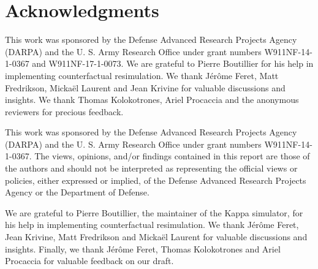 \section*{Acknowledgments}

\ifshort This work was sponsored by the Defense Advanced Research
Projects Agency (DARPA) and the U. S. Army Research Office under grant
numbers W911NF-14-1-0367 and W911NF-17-1-0073.  We are grateful to
Pierre Boutillier for his help in implementing counterfactual
resimulation. We thank J\'{e}r\^{o}me Feret, Matt Fredrikson,
Micka\"{e}l Laurent and Jean Krivine for valuable discussions and
insights. We thank Thomas Kolokotrones, Ariel Procaccia and the
anonymous reviewers for precious feedback.

\else

This work was sponsored by the Defense Advanced Research Projects
Agency (DARPA) and the U. S. Army Research Office under grant numbers
W911NF-14-1-0367.  The views, opinions, and/or findings
contained in this report are those of the authors and should not be
interpreted as representing the official views or policies, either
expressed or implied, of the Defense Advanced Research Projects Agency
or the Department of Defense. 

We are grateful to Pierre Boutillier, the maintainer of the Kappa
simulator, for his help in implementing counterfactual resimulation.
We thank J\'{e}r\^{o}me Feret, Jean Krivine, Matt Fredrikson and
Micka\"{e}l Laurent for valuable discussions and insights.  Finally,
we thank J\'{e}r\^{o}me Feret, Thomas Kolokotrones and Ariel Procaccia
for valuable feedback on our draft.
\fi
